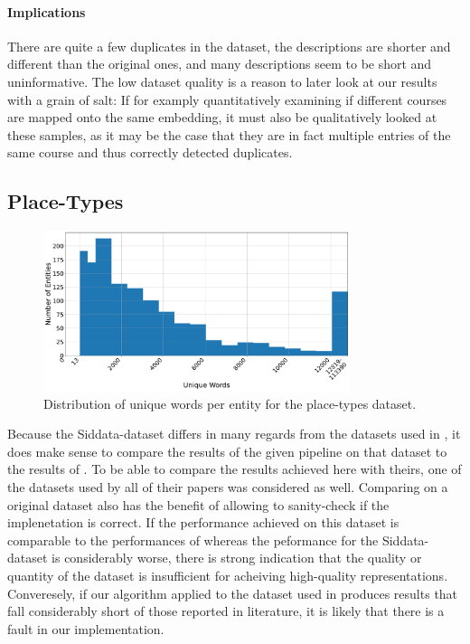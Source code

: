 \paragraph{Implications} There are quite a few duplicates in the dataset, the descriptions are shorter and different than the original ones, and many descriptions seem to be short and uninformative. The low dataset quality is a reason to later look at our results with a grain of salt: If for examply quantitatively examining if different courses are mapped onto the same embedding, it must also be qualitatively looked at these samples, as it may be the case that they are in fact multiple entries of the same course and thus correctly detected duplicates.







\subsection{Place-Types}
\label{sec:dataset_placetypes}


\begin{figure}[H]
	\centering
	\includegraphics[width=0.8\textwidth]{graphics/figures/placetypes_dist_unique.pdf}
	\caption{Distribution of unique words per entity for the place-types dataset.}
	\label{fig:placetypes_dist_unique}
\end{figure}




Because the Siddata-dataset differs in many regards from the datasets used in \mainalgos, %
it does make sense to compare the results of the given pipeline on that dataset to the results of \mainalgos. To be able to compare the results achieved here with theirs, one of the datasets used by all of their papers was considered as well. Comparing on a original dataset also has the benefit of allowing to sanity-check if the implenetation is correct. If the performance achieved on this dataset is comparable to the performances of \mainalgos whereas the peformance for the Siddata-dataset is considerably worse, there is strong indication that the quality or quantity of the dataset is insufficient for acheiving high-quality representations. Converesely, if our algorithm applied to the dataset used in \mainalgos produces results that fall considerably short of those reported in literature, it is likely that there is a fault in our implementation.

